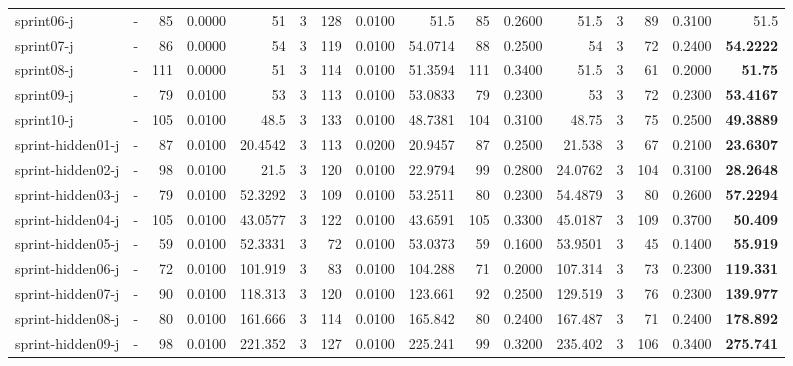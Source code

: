 \documentclass[a4paper]{article}
\begin{document}
\begin{sidewaystable}[h]
\begin{tabular}{l|r|r|r|r|r|r|r|r|r|r|r|r|r|r|r}
sprint06-j & \multicolumn{1}{c|}{ - } & 85 & 0.0000 & 51 & 3 & 128 & 0.0100 & 51.5 & 85 & 0.2600 & 51.5 & 3 & 89 & 0.3100 & 51.5 \\
sprint07-j & \multicolumn{1}{c|}{ - } & 86 & 0.0000 & 54 & 3 & 119 & 0.0100 & 54.0714 & 88 & 0.2500 & 54 & 3 & 72 & 0.2400 & \textbf{54.2222} \\
sprint08-j & \multicolumn{1}{c|}{ - } & 111 & 0.0000 & 51 & 3 & 114 & 0.0100 & 51.3594 & 111 & 0.3400 & 51.5 & 3 & 61 & 0.2000 & \textbf{51.75} \\
sprint09-j & \multicolumn{1}{c|}{ - } & 79 & 0.0100 & 53 & 3 & 113 & 0.0100 & 53.0833 & 79 & 0.2300 & 53 & 3 & 72 & 0.2300 & \textbf{53.4167} \\
sprint10-j & \multicolumn{1}{c|}{ - } & 105 & 0.0100 & 48.5 & 3 & 133 & 0.0100 & 48.7381 & 104 & 0.3100 & 48.75 & 3 & 75 & 0.2500 & \textbf{49.3889} \\
sprint-hidden01-j & \multicolumn{1}{c|}{ - } & 87 & 0.0100 & 20.4542 & 3 & 113 & 0.0200 & 20.9457 & 87 & 0.2500 & 21.538 & 3 & 67 & 0.2100 & \textbf{23.6307} \\
sprint-hidden02-j & \multicolumn{1}{c|}{ - } & 98 & 0.0100 & 21.5 & 3 & 120 & 0.0100 & 22.9794 & 99 & 0.2800 & 24.0762 & 3 & 104 & 0.3100 & \textbf{28.2648} \\
sprint-hidden03-j & \multicolumn{1}{c|}{ - } & 79 & 0.0100 & 52.3292 & 3 & 109 & 0.0100 & 53.2511 & 80 & 0.2300 & 54.4879 & 3 & 80 & 0.2600 & \textbf{57.2294} \\
sprint-hidden04-j & \multicolumn{1}{c|}{ - } & 105 & 0.0100 & 43.0577 & 3 & 122 & 0.0100 & 43.6591 & 105 & 0.3300 & 45.0187 & 3 & 109 & 0.3700 & \textbf{50.409} \\
sprint-hidden05-j & \multicolumn{1}{c|}{ - } & 59 & 0.0100 & 52.3331 & 3 & 72 & 0.0100 & 53.0373 & 59 & 0.1600 & 53.9501 & 3 & 45 & 0.1400 & \textbf{55.919} \\
sprint-hidden06-j & \multicolumn{1}{c|}{ - } & 72 & 0.0100 & 101.919 & 3 & 83 & 0.0100 & 104.288 & 71 & 0.2000 & 107.314 & 3 & 73 & 0.2300 & \textbf{119.331} \\
sprint-hidden07-j & \multicolumn{1}{c|}{ - } & 90 & 0.0100 & 118.313 & 3 & 120 & 0.0100 & 123.661 & 92 & 0.2500 & 129.519 & 3 & 76 & 0.2300 & \textbf{139.977} \\
sprint-hidden08-j & \multicolumn{1}{c|}{ - } & 80 & 0.0100 & 161.666 & 3 & 114 & 0.0100 & 165.842 & 80 & 0.2400 & 167.487 & 3 & 71 & 0.2400 & \textbf{178.892} \\
sprint-hidden09-j & \multicolumn{1}{c|}{ - } & 98 & 0.0100 & 221.352 & 3 & 127 & 0.0100 & 225.241 & 99 & 0.3200 & 235.402 & 3 & 106 & 0.3400 & \textbf{275.741} \\

\end{tabular}
\end{sidewaystable}
\end{document}
